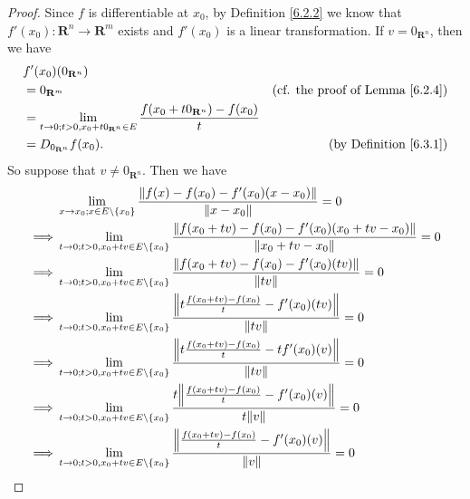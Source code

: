 \begin{proof}
    Since \(f\) is differentiable at \(x_0\), by Definition \ref{6.2.2} we know that \(f'(x_0) : \mathbf{R}^n \to \mathbf{R}^m\) exists and \(f'(x_0)\) is a linear transformation.
    If \(v = 0_{\mathbf{R}^n}\), then we have
    \begin{align*}
         & f'(x_0)(0_{\mathbf{R}^n})                                                                                                                             \\
         & = 0_{\mathbf{R}^m}                                                                                      & \text{(cf. the proof of Lemma \ref{6.2.4})} \\
         & = \lim_{t \to 0 ; t > 0, x_0 + t 0_{\mathbf{R}^n} \in E} \frac{f(x_0 + t 0_{\mathbf{R}^n}) - f(x_0)}{t}                                               \\
         & = D_{0_{\mathbf{R}^n}} f(x_0).                                                                          & \text{(by Definition \ref{6.3.1})}
    \end{align*}
    So suppose that \(v \neq 0_{\mathbf{R}^n}\).
    Then we have
    \begin{align*}
                 & \lim_{x \to x_0 ; x \in E \setminus \{x_0\}} \frac{\norm*{f(x) - f(x_0) - f'(x_0)(x - x_0)}}{\norm*{x - x_0}} = 0                                  \\
        \implies & \lim_{t \to 0 ; t > 0, x_0 + tv \in E \setminus \{x_0\}} \frac{\norm*{f(x_0 + tv) - f(x_0) - f'(x_0)(x_0 + tv - x_0)}}{\norm*{x_0 + tv - x_0}} = 0 \\
        \implies & \lim_{t \to 0 ; t > 0, x_0 + tv \in E \setminus \{x_0\}} \frac{\norm*{f(x_0 + tv) - f(x_0) - f'(x_0)(tv)}}{\norm*{tv}} = 0                         \\
        \implies & \lim_{t \to 0 ; t > 0, x_0 + tv \in E \setminus \{x_0\}} \frac{\norm*{t \frac{f(x_0 + tv) - f(x_0)}{t} - f'(x_0)(tv)}}{\norm*{tv}} = 0             \\
        \implies & \lim_{t \to 0 ; t > 0, x_0 + tv \in E \setminus \{x_0\}} \frac{\norm*{t \frac{f(x_0 + tv) - f(x_0)}{t} - t f'(x_0)(v)}}{\norm*{tv}} = 0            \\
        \implies & \lim_{t \to 0 ; t > 0, x_0 + tv \in E \setminus \{x_0\}} \frac{t \norm*{\frac{f(x_0 + tv) - f(x_0)}{t} - f'(x_0)(v)}}{t \norm*{v}} = 0             \\
        \implies & \lim_{t \to 0 ; t > 0, x_0 + tv \in E \setminus \{x_0\}} \frac{\norm*{\frac{f(x_0 + tv) - f(x_0)}{t} - f'(x_0)(v)}}{\norm*{v}} = 0                 \\

\end{align*}
\end{proof}
